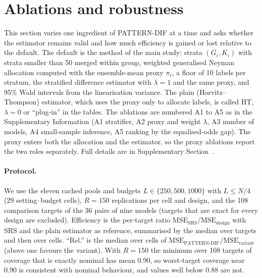 \section{Ablations and robustness}
\label{sec:ablations}

This section varies one ingredient of PATTERN-DIF at a time and asks whether the estimator remains valid and how much efficiency is gained or lost relative to the default. The default is the method of the main study: strata $(G_i,K_i)$ with strata smaller than 50 merged within group, weighted generalised Neyman allocation \citep{neyman1934} computed with the ensemble-mean proxy $\pi_i$, a floor of 10 labels per stratum, the stratified difference estimator with $\lambda=1$ and the same proxy, and 95\% Wald intervals from the linearisation variance. The plain (Horvitz--Thompson) estimator, which uses the proxy only to allocate labels, is called HT, $\lambda=0$ or ``plug-in'' in the tables. The ablations are numbered A1 to A5 as in the Supplementary Information (A1 stratifier, A2 proxy and weight $\lambda$, A3 number of models, A4 small-sample inference, A5 ranking by the equalised-odds gap). The proxy enters both the allocation and the estimator, so the proxy ablations report the two roles separately. Full details are in Supplementary Section~.

\paragraph{Protocol.} We use the eleven cached pools and budgets $L\in\{250,500,1000\}$ with $L\le N/4$ (29 setting--budget cells), $R=150$ replications per cell and design, and the 108 comparison targets of the 36 pairs of nine models (targets that are exact for every design are excluded). Efficiency is the per-target ratio $\mathrm{MSE}_{\mathrm{SRS}}/\mathrm{MSE}_{\mathrm{design}}$ with SRS and the plain estimator as reference, summarised by the median over targets and then over cells. ``Rel.'' is the median over cells of $\mathrm{MSE}_{\mathrm{PATTERN\text{-}DIF}}/\mathrm{MSE}_{\mathrm{variant}}$ (above one favours the variant). With $R=150$ the minimum over 108 targets of coverage that is exactly nominal has mean 0.90, so worst-target coverage near 0.90 is consistent with nominal behaviour, and values well below 0.88 are not.

\begin{table}[t]
\centering\small
\caption{Stratifier ablation (A1). Efficiency vs SRS (plain estimator): median over cells of the median over targets of $\mathrm{MSE}_{\mathrm{SRS}}/\mathrm{MSE}$. Rel.: median over the 29 cells of $\mathrm{MSE}_{\mathrm{PATTERN\text{-}DIF}}/\mathrm{MSE}_{\mathrm{variant}}$; Win: share of cells with Rel.\ $>1$. Coverage: mean over cells of the mean over targets (mean) and of the worst target (worst), nominal 0.95. Source: \texttt{results/label\_ablations\_dif.json}.}
\label{tab:abl-design}

\end{table}

